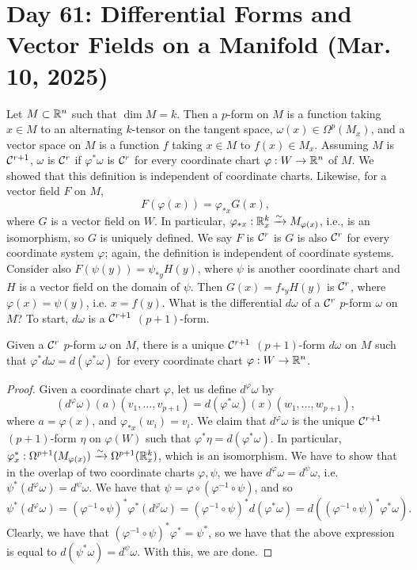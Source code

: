 \section{Day 61: Differential Forms and Vector Fields on a Manifold (Mar. 10, 2025)}
Let $M \subset \mathbb R^n$ such that $\dim M = k$. Then a $p$-form on $M$ is a function taking $x \in M$ to an alternating $k$-tensor on the tangent space, $\omega(x) \in \Omega^p(M_x)$, and a vector space on $M$ is a function $f$ taking $x \in M$ to $f(x) \in M_x$.
\medskip\newline
Assuming $M$ is $\mathcal C^{r+1}$, $\omega$ is $\mathcal C^r$ if $\varphi^\ast \omega$ is $\mathcal C^r$ for every coordinate chart $\varphi : W \to \mathbb R^n$ of $M$. We showed that this definition is independent of coordinate charts. Likewise, for a vector field $F$ on $M$,
\[ F(\varphi(x)) = \varphi_{\ast x} G(x), \]
where $G$ is a vector field on $W$. In particular, $\varphi_{\ast x} : \mathbb R^k_x \xrightarrow{\sim} M_{\varphi(x)}$, i.e., is an isomorphism, so $G$ is uniquely defined. We say $F$ is $\mathcal C^r$ is $G$ is also $\mathcal C^r$ for every coordinate system $\varphi$; again, the definition is independent of coordinate systems. Consider also $F(\psi(y)) = \psi_{\ast y} H(y)$, where $\psi$ is another coordinate chart and $H$ is a vector field on the domain of $\psi$. Then $G(x) = f_{\ast y} H(y)$ is $\mathcal C^r$, where $\varphi(x) = \psi(y)$, i.e. $x = f(y)$.
\medskip\newline
What is the differential $d\omega$ of a $\mathcal C^r$ $p$-form $\omega$ on $M$? To start, $d\omega$ is a $\mathcal C^{r+1}$ $(p+1)$-form.
\begin{simpleprop}[Spivak 5-3]
    Given a $\mathcal C^r$ $p$-form $\omega$ on $M$, there is a unique $\mathcal C^{r+1}$ $(p+1)$-form $d\omega$ on $M$ such that $\varphi^{\ast} d\omega = d(\varphi^\ast \omega)$ for every coordinate chart $\varphi : W \to \mathbb R^n$.
\end{simpleprop}
\begin{proof}
    Given a coordinate chart $\varphi$, let us define $d^\varphi \omega$ by
    \[ (d^\varphi \omega)(a)(v_1, \dots, v_{p+1}) = d(\varphi^\ast \omega)(x)(w_1, \dots, w_{p+1}), \tag{$v_i \in M_a$} \]
    where $a = \varphi(x)$, and $\varphi_{\ast x}(w_i) = v_i$. We claim that $d^\varphi \omega$ is the unique $\mathcal C^{r+1}$ $(p+1)$-form $\eta$ on $\varphi(W)$ such that $\varphi^\ast \eta = d(\varphi^\ast \omega)$. In particular, $\varphi^\ast_x : \Omega^{p+1}(M_{\varphi(x)}) \xrightarrow{\sim} \Omega^{p+1}(\mathbb R^k_x)$, which is an isomorphism. We have to show that in the overlap of two coordinate charts $\varphi, \psi$, we have $d^\varphi \omega = d^\psi \omega$, i.e. $\psi^\ast (d^\varphi \omega) = d^\psi \omega$. We have that $\psi = \varphi \circ (\varphi^{-1} \circ \psi)$, and so
    \[ \psi^{\ast} (d^\varphi \omega) = (\varphi^{-1} \circ \psi)^\ast \varphi^\ast (d^\varphi \omega) = (\varphi^{-1} \circ \psi)^\ast d(\varphi^\ast \omega) = d((\varphi^{-1} \circ \psi)^\ast \varphi^\ast \omega). \]
    Clearly, we have that $(\varphi^{-1} \circ \psi)^\ast \varphi^\ast = \psi^\ast$, so we have that the above expression is equal to $d(\psi^\ast \omega) = d^\psi \omega$. With this, we are done.
\end{proof}
